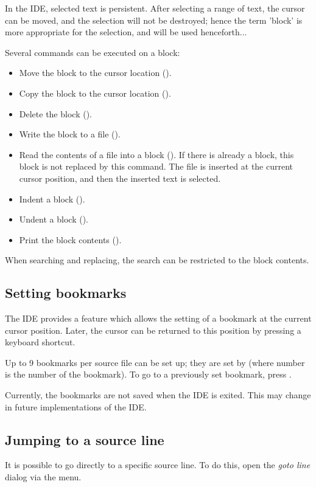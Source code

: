 In the \fpc IDE, selected text is persistent. After selecting a range of
text, the cursor can be moved, and the selection will not be destroyed;
hence the term 'block' is more appropriate for the selection, and will be
used henceforth...

Several commands can be executed on a block:
\begin{itemize}
\item Move the block to the cursor location ().
\item Copy the block to the cursor location ().
\item Delete the block ().
\item Write the block to a file ().
\item Read the contents of a file into a block ().
If there is already a block, this block is not replaced by this command.
The file is inserted at the current cursor position, and then the
inserted text is selected.
\item Indent a block ().
\item Undent a block ().
\item Print the block contents ().
\end{itemize}
When searching and replacing, the search can be restricted to the block
contents.

%
%
\subsection{Setting bookmarks}
\label{se:bookmarks}
The IDE provides a feature which allows the setting of a bookmark at the current
cursor position. Later, the cursor can be returned to this position
by pressing a keyboard shortcut.

Up to 9 bookmarks per source file can be set up; they are set by
 (where number is the number of the bookmark).
To go to a previously set bookmark, press .

\begin{remark}
Currently, the bookmarks are not saved when the IDE is exited. 
This may change in future implementations of the IDE.
\end{remark}

%
%
\subsection{Jumping to a source line}
It is possible to go directly to a specific source line. To do this, open
the {\em goto line} dialog via the  menu.

